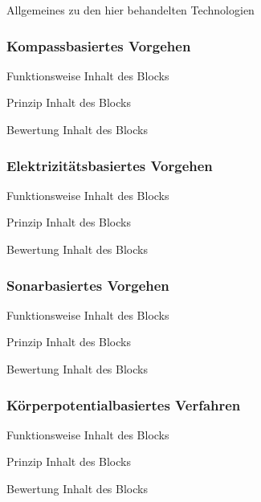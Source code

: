\begin{frame}
Allgemeines zu den hier behandelten Technologien
\end{frame}

\subsubsection{Kompassbasiertes Vorgehen}
\begin{frame}
\begin{block}{Funktionsweise}
Inhalt des Blocks
\end{block}
\begin{block}{Prinzip}
Inhalt des Blocks
\end{block}
\begin{block}{Bewertung}
Inhalt des Blocks
\end{block}
\end{frame}

\subsubsection{Elektrizitätsbasiertes Vorgehen}
\begin{frame}
\begin{block}{Funktionsweise}
Inhalt des Blocks
\end{block}
\begin{block}{Prinzip}
Inhalt des Blocks
\end{block}
\begin{block}{Bewertung}
Inhalt des Blocks
\end{block}
\end{frame}

\subsubsection{Sonarbasiertes Vorgehen}
\begin{frame}
\begin{block}{Funktionsweise}
Inhalt des Blocks
\end{block}
\begin{block}{Prinzip}
Inhalt des Blocks
\end{block}
\begin{block}{Bewertung}
Inhalt des Blocks
\end{block}
\end{frame}

\subsubsection{Körperpotentialbasiertes Verfahren}
\begin{frame}
\begin{block}{Funktionsweise}
Inhalt des Blocks
\end{block}
\begin{block}{Prinzip}
Inhalt des Blocks
\end{block}
\begin{block}{Bewertung}
Inhalt des Blocks
\end{block}
\end{frame}
